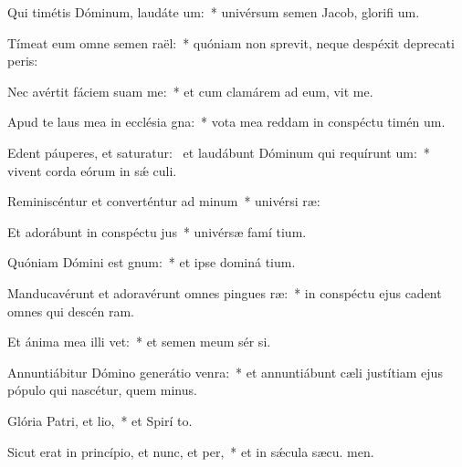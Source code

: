 \item Qui timétis Dóminum, laudáte um:~* univérsum semen Jacob, glorifi um.
\item Tímeat eum omne semen raël:~* quóniam non sprevit, neque despéxit deprecati peris:
\item Nec avértit fáciem suam  me:~* et cum clamárem ad eum, vit me.
\item Apud te laus mea in ecclésia gna:~* vota mea reddam in conspéctu timén um.
\item Edent páuperes, et saturatur:~\pscross{} et laudábunt Dóminum qui requírunt um:~* vivent corda eórum in sǽ culi.
\item Reminiscéntur et converténtur ad minum~* univérsi  ræ:
\item Et adorábunt in conspéctu jus~* univérsæ famí tium.
\item Quóniam Dómini est gnum:~* et ipse dominá tium.
\item Manducavérunt et adoravérunt omnes pingues ræ:~* in conspéctu ejus cadent omnes qui descén  ram.
\item Et ánima mea illi vet:~* et semen meum sér si.
\item Annuntiábitur Dómino generátio venra:~* et annuntiábunt cæli justítiam ejus pópulo qui nascétur, quem  minus.
\item Glória Patri, et lio,~* et Spirí to.
\item Sicut erat in princípio, et nunc, et per,~* et in sǽcula sæcu. men.

